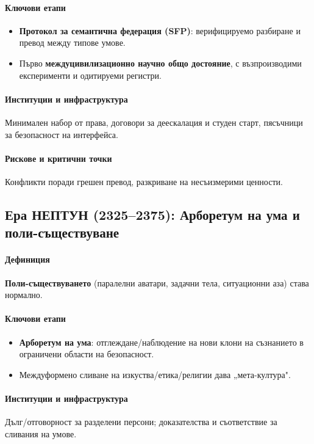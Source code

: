 \documentclass[11pt]{article}
\begin{document}
\paragraph{Ключови етапи}
\begin{itemize}[noitemsep]
  \item \textbf{Протокол за семантична федерация (SFP)}: верифицируемо разбиране и превод между типове умове.
  \item Първо \textbf{междуцивилизационно научно общо достояние}, с възпроизводими експерименти и одитируеми регистри.
\end{itemize}

\paragraph{Институции и инфраструктура} Минимален набор от права, договори за деескалация и студен старт, пясъчници за безопасност на интерфейса.

\paragraph{Рискове и критични точки} Конфликти поради грешен превод, разкриване на несъизмерими ценности.

\subsection{Ера НЕПТУН (2325–2375): Арборетум на ума и поли-съществуване}
\paragraph{Дефиниция} \textbf{Поли-съществуването} (паралелни аватари, задачни тела, ситуационни аза) става нормално.

\paragraph{Ключови етапи}
\begin{itemize}[noitemsep]
  \item \textbf{Арборетум на ума}: отглеждане/наблюдение на нови клони на съзнанието в ограничени области на безопасност.
  \item Междуформено сливане на изкуства/етика/религии дава „мета-култура".
\end{itemize}

\paragraph{Институции и инфраструктура} Дълг/отговорност за разделени персони; доказателства и съответствие за сливания на умове.
\end{document}

